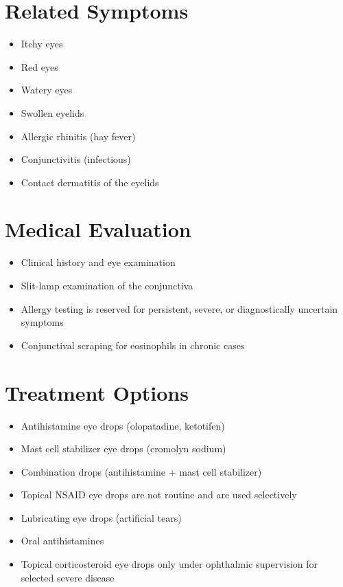 \section*{Related Symptoms}
\begin{itemize}
\item Itchy eyes
\item Red eyes
\item Watery eyes
\item Swollen eyelids
\item Allergic rhinitis (hay fever)
\item Conjunctivitis (infectious)
\item Contact dermatitis of the eyelids
\end{itemize}

\section*{Medical Evaluation}
\begin{itemize}
\item Clinical history and eye examination
\item Slit-lamp examination of the conjunctiva
\item Allergy testing is reserved for persistent, severe, or diagnostically uncertain symptoms
\item Conjunctival scraping for eosinophils in chronic cases
\end{itemize}

\section*{Treatment Options}
\begin{itemize}
\item Antihistamine eye drops (olopatadine, ketotifen)
\item Mast cell stabilizer eye drops (cromolyn sodium)
\item Combination drops (antihistamine + mast cell stabilizer)
\item Topical NSAID eye drops are not routine and are used selectively
\item Lubricating eye drops (artificial tears)
\item Oral antihistamines
\item Topical corticosteroid eye drops only under ophthalmic supervision for selected severe disease
\end{itemize}
